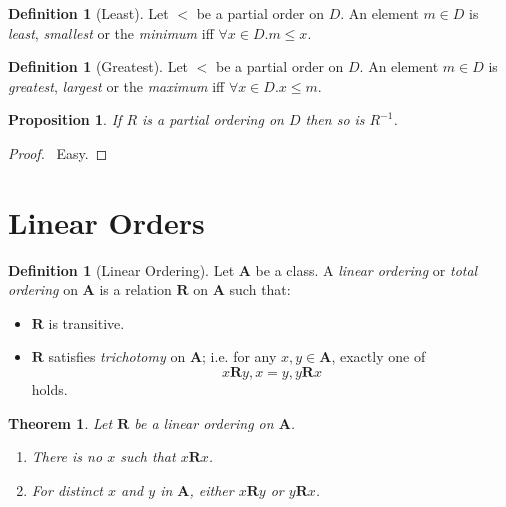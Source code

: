 \documentclass{article}
\let\qed\relax
\newtheorem{proposition}[axiom]{Proposition}
\newtheorem{theorem}[axiom]{Theorem}
\theoremstyle{definition}
\newtheorem{definition}[axiom]{Definition}
\newcommand{\inv}[1]{\ensuremath{{#1}^{-1}}}
\begin{document}
    \begin{definition}[Least]
        Let $<$ be a partial order on $D$. An element $m \in D$ is \emph{least}, \emph{smallest} or the
        \emph{minimum} iff $\forall x \in D. m \leq x$.
    \end{definition}

    \begin{definition}[Greatest]
        Let $<$ be a partial order on $D$. An element $m \in D$ is \emph{greatest}, \emph{largest} or the
        \emph{maximum} iff $\forall x \in D. x \leq m$.
    \end{definition}

    \begin{proposition}
        If $R$ is a partial ordering on $D$ then so is $\inv{R}$.
    \end{proposition}

    \begin{proof}
        \pf\ Easy. \qed
    \end{proof}
    
    \section{Linear Orders}

    \begin{definition}[Linear Ordering]
        Let $\mathbf{A}$ be a class. A \emph{linear ordering} or \emph{total ordering} on $\mathbf{A}$
        is a relation $\mathbf{R}$ on $\mathbf{A}$ such that:
        \begin{itemize}
            \item $\mathbf{R}$ is transitive.
            \item $\mathbf{R}$ satisfies \emph{trichotomy} on $\mathbf{A}$; i.e. for any $x, y \in \mathbf{A}$,
            exactly one of
            \[ x\mathbf{R}y, x=y, y\mathbf{R}x \]
            holds.
        \end{itemize}
    \end{definition}

    \begin{theorem}
        Let $\mathbf{R}$ be a linear ordering on $\mathbf{A}$.
        \begin{enumerate}
            \item There is no $x$ such that $x \mathbf{R} x$.
            \item For distinct $x$ and $y$ in $\mathbf{A}$, either $x\mathbf{R}y$ or $y\mathbf{R}x$.
        \end{enumerate}
    \end{theorem}
\end{document}
